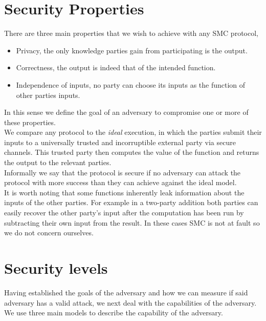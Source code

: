 \documentclass[ %
                    author={Nicholas Tutte},
                supervisor={Prof. Nigel Smart},
                    degree={MEng},
                     title={Secure Two Party Computation},
                  subtitle={A practical comparison of recent protocols},
                      type={Research - GG1K},
                      year={2015} ]{dissertation}
\begin{document}
		\section{Security Properties} \label{sub:SecurityProperties}
			There are three main properties that we wish to achieve with any SMC protocol,
			\begin{itemize}
				\item Privacy, the only knowledge parties gain from participating is the output.
				\item Correctness, the output is indeed that of the intended function.
				\item Independence of inputs, no party can choose its inputs as the function of other parties inputs.
			\end{itemize}

			In this sense we define the goal of an adversary to compromise one or more of these properties.\\

			We compare any protocol to the \emph{ideal} execution, in which the parties submit their inputs to a universally trusted and incorruptible external party via secure channels. This trusted party then computes the value of the function and returns the output to the relevant parties.\\

			Informally we say that the protocol is secure if no adversary can attack the protocol with more success than they can achieve against the ideal model.\\

			It is worth noting that some functions inherently leak information about the inputs of the other parties. For example in a two-party addition both parties can easily recover the other party's input after the computation has been run by subtracting their own input from the result. In these cases SMC is not at fault so we do not concern ourselves.\\


		\section{Security levels}\label{sub:SecurityLevels}
			Having established the goals of the adversary and how we can measure if said adversary has a valid attack, we next deal with the capabilities of the adversary. We use three main models to describe the capability of the adversary.
\end{document}
